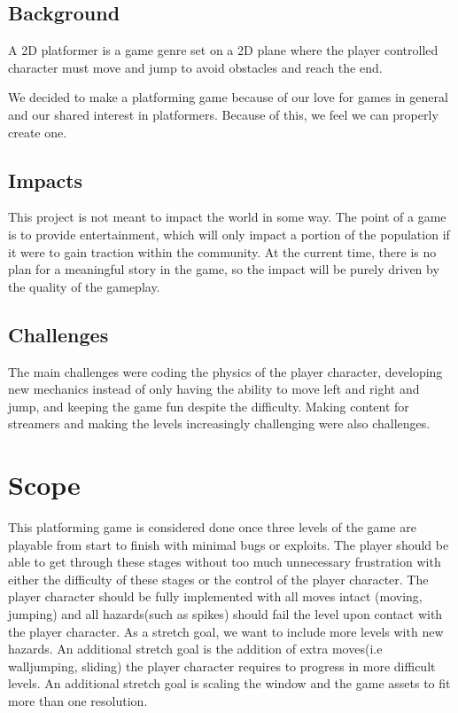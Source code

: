 \documentclass[10pt,conference,onecolumn,compsoc]{IEEEtran}
\begin{document}
\subsection{Background}
A 2D platformer is a game genre set on a 2D plane where the player controlled character must move and jump to avoid obstacles and reach the end.

We decided to make a platforming game because of our love for games in general and our shared interest in platformers. Because of this, we feel we can properly create one.



\subsection{Impacts}
This project is not meant to impact the world in some way. The point of a game is to provide entertainment, which will only impact a portion of the population if it were to gain traction within the community. At the current time, there is no plan for a meaningful story in the game, so the impact will be purely driven by the quality of the gameplay.

\subsection{Challenges}
The main challenges were coding the physics of the player character, developing new mechanics instead of only having the ability to move left and right and jump, and keeping the game fun despite the difficulty. Making content for streamers and making the levels increasingly challenging were also challenges.


\section{Scope}
This platforming game is considered done once three levels of the game are playable from start to finish with minimal bugs or exploits. The player should be able to get through these stages without too much unnecessary frustration with either the difficulty of these stages or the control of the player character. The player character should be fully implemented with all moves intact (moving, jumping) and all hazards(such as spikes) should fail the level upon contact with the player character. As a stretch goal, we want to include more levels with new hazards. An additional stretch goal is the addition of extra moves(i.e walljumping, sliding) the player character requires to progress in more difficult levels. An additional stretch goal is scaling the window and the game assets to fit more than one resolution.
\end{document}

